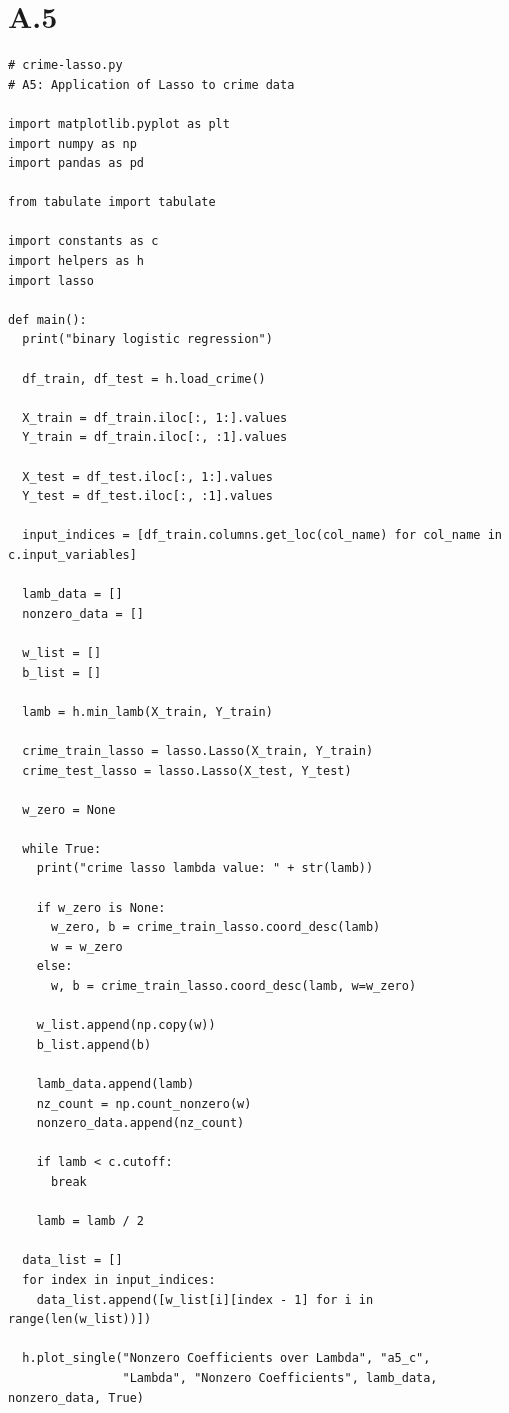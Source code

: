 \documentclass{article}
\newcommand{\1}{\mathbf{1}}
\begin{document}
\section*{A.5}
{\Large 

\begin{verbatim}
# crime-lasso.py
# A5: Application of Lasso to crime data

import matplotlib.pyplot as plt
import numpy as np
import pandas as pd

from tabulate import tabulate

import constants as c
import helpers as h
import lasso

def main():
  print("binary logistic regression")

  df_train, df_test = h.load_crime()

  X_train = df_train.iloc[:, 1:].values
  Y_train = df_train.iloc[:, :1].values

  X_test = df_test.iloc[:, 1:].values
  Y_test = df_test.iloc[:, :1].values

  input_indices = [df_train.columns.get_loc(col_name) for col_name in c.input_variables]

  lamb_data = []
  nonzero_data = []

  w_list = []
  b_list = []

  lamb = h.min_lamb(X_train, Y_train)

  crime_train_lasso = lasso.Lasso(X_train, Y_train)
  crime_test_lasso = lasso.Lasso(X_test, Y_test)

  w_zero = None

  while True:
    print("crime lasso lambda value: " + str(lamb))

    if w_zero is None:
      w_zero, b = crime_train_lasso.coord_desc(lamb)
      w = w_zero
    else:
      w, b = crime_train_lasso.coord_desc(lamb, w=w_zero)

    w_list.append(np.copy(w))
    b_list.append(b)

    lamb_data.append(lamb)
    nz_count = np.count_nonzero(w)
    nonzero_data.append(nz_count)

    if lamb < c.cutoff:
      break

    lamb = lamb / 2

  data_list = []
  for index in input_indices:
    data_list.append([w_list[i][index - 1] for i in range(len(w_list))])

  h.plot_single("Nonzero Coefficients over Lambda", "a5_c",
                "Lambda", "Nonzero Coefficients", lamb_data, nonzero_data, True)
  

\end{verbatim}}
\end{document}
